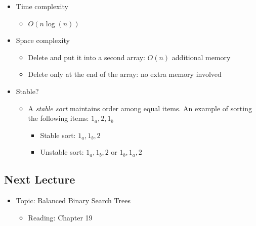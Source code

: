 \documentclass[
  10pt,
  english,
  letterpaper,
,tablecaptionabove
]{scrartcl}
\providecommand{\tightlist}{%
  \setlength{\itemsep}{0pt}\setlength{\parskip}{0pt}}
\begin{document}
\begin{itemize}
\tightlist
\item
  Time complexity

  \begin{itemize}
  \tightlist
  \item
    \(O(n\log(n))\)
  \end{itemize}
\item
  Space complexity

  \begin{itemize}
  \tightlist
  \item
    Delete and put it into a second array: \(O(n)\) additional memory
  \item
    Delete only at the end of the array: no extra memory involved
  \end{itemize}
\item
  Stable?

  \begin{itemize}
  \tightlist
  \item
    A \emph{stable sort} maintains order among equal items. An example
    of sorting the following items: \(1_a, 2, 1_b\)

    \begin{itemize}
    \tightlist
    \item
      Stable sort: \(1_a, 1_b, 2\)
    \item
      Unstable sort: \(1_a, 1_b, 2\) or \(1_b, 1_a, 2\)
    \end{itemize}
  \end{itemize}
\end{itemize}

\hypertarget{next-lecture}{%
\subsection{Next Lecture}\label{next-lecture}}

\begin{itemize}
\tightlist
\item
  Topic: Balanced Binary Search Trees

  \begin{itemize}
  \tightlist
  \item
    Reading: Chapter 19
  \end{itemize}
\end{itemize}
\end{document}
